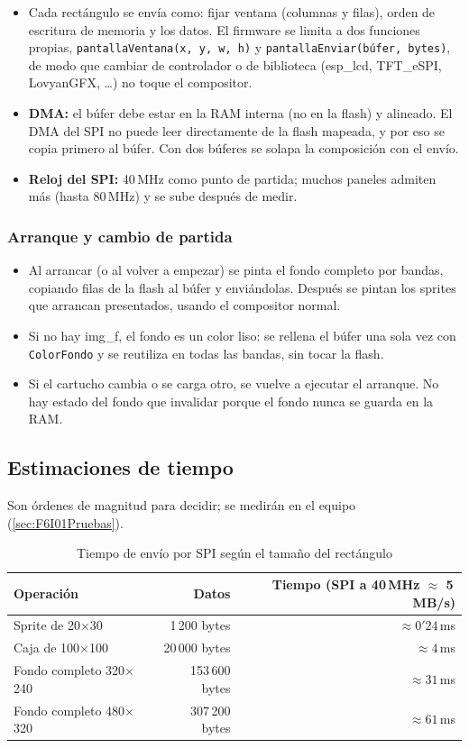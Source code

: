 \begin{itemize}
	\item Cada rectángulo se envía como: fijar ventana (columnas y filas), orden de escritura de memoria y los datos. El firmware se limita a dos funciones propias, \texttt{pantallaVentana(x, y, w, h)} y \texttt{pantallaEnviar(búfer, bytes)}, de modo que cambiar de controlador o de biblioteca (esp\_lcd, TFT\_eSPI, LovyanGFX, \ldots) no toque el compositor.
	\item \textbf{DMA:} el búfer debe estar en la RAM interna (no en la flash) y alineado. El DMA del SPI no puede leer directamente de la flash mapeada, y por eso se copia primero al búfer. Con dos búferes se solapa la composición con el envío.
	\item \textbf{Reloj del SPI:} 40\,MHz como punto de partida; muchos paneles admiten más (hasta 80\,MHz) y se sube después de medir.
\end{itemize}

\subsubsection{Arranque y cambio de partida}

\begin{itemize}
	\item Al arrancar (o al volver a empezar) se pinta el fondo completo por bandas, copiando filas de la flash al búfer y enviándolas. Después se pintan los sprites que arrancan presentados, usando el compositor normal.
	\item Si no hay img\_f, el fondo es un color liso: se rellena el búfer una sola vez con \texttt{ColorFondo} y se reutiliza en todas las bandas, sin tocar la flash.
	\item Si el cartucho cambia o se carga otro, se vuelve a ejecutar el arranque. No hay estado del fondo que invalidar porque el fondo nunca se guarda en la RAM.
\end{itemize}

\subsection{Estimaciones de tiempo}
\label{sec:F6I01Tiempos}

Son órdenes de magnitud para decidir; se medirán en el equipo (\ref{sec:F6I01Pruebas}).

\begin{table}[H]
	\centering
	\begin{tabular}{lrr}
		\toprule
		Operación & Datos & Tiempo (SPI a 40\,MHz $\approx$ 5\,MB/s) \\
		\midrule
		Sprite de 20$\times$30 & 1\,200 bytes & $\approx 0'24$\,ms \\
		Caja de 100$\times$100 & 20\,000 bytes & $\approx 4$\,ms \\
		Fondo completo 320$\times$240 & 153\,600 bytes & $\approx 31$\,ms \\
		Fondo completo 480$\times$320 & 307\,200 bytes & $\approx 61$\,ms \\
		\bottomrule
	\end{tabular}
	\caption{Tiempo de envío por SPI según el tamaño del rectángulo}
	\label{tab:F6I01Tiempos}
\end{table}

